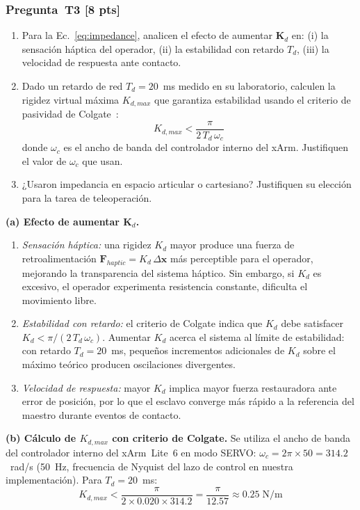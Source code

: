 \documentclass[journal,10pt,twoside]{IEEEtran}
\newcommand{\pts}[1]{\textcolor{tec_red}{\textbf{[#1 pts]}}}
\begin{document}
\subsubsection*{Pregunta~T3 \pts{8}}
\begin{enumerate}[label=(\alph*)]
  \item Para la Ec.~\eqref{eq:impedance}, analicen el efecto de
        aumentar $\bm{K}_d$ en: (i) la sensación háptica del operador,
        (ii) la estabilidad con retardo $T_d$, (iii) la velocidad
        de respuesta ante contacto.
  \item Dado un retardo de red $T_d = 20$~ms medido en su laboratorio,
        calculen la rigidez virtual máxima $K_{d,max}$ que garantiza
        estabilidad usando el criterio de pasividad de Colgate~\cite{colgate1993}:
        \[
          K_{d,max} < \frac{\pi}{2\,T_d\,\omega_c}
        \]
        donde $\omega_c$ es el ancho de banda del controlador interno
        del xArm. Justifiquen el valor de $\omega_c$ que usan.
  \item ¿Usaron impedancia en espacio articular o cartesiano?
        Justifiquen su elección para la tarea de teleoperación.
\end{enumerate}

\textbf{(a) Efecto de aumentar $\bm{K}_d$.}
\begin{enumerate}[label=\roman*.]
  \item \textit{Sensación háptica:} una rigidez $K_d$ mayor produce una
        fuerza de retroalimentación $\bm{F}_{haptic} = K_d\,\Delta\bm{x}$
        más perceptible para el operador, mejorando la transparencia del
        sistema háptico. Sin embargo, si $K_d$ es excesivo, el operador
        experimenta resistencia constante, dificulta el movimiento libre.
  \item \textit{Estabilidad con retardo:} el criterio de Colgate indica
        que $K_d$ debe satisfacer $K_d < \pi/(2\,T_d\,\omega_c)$.
        Aumentar $K_d$ acerca el sistema al límite de estabilidad:
        con retardo $T_d = 20$~ms, pequeños incrementos adicionales
        de $K_d$ sobre el máximo teórico producen oscilaciones
        divergentes.
  \item \textit{Velocidad de respuesta:} mayor $K_d$ implica mayor
        fuerza restauradora ante error de posición, por lo que el
        esclavo converge más rápido a la referencia del maestro durante
        eventos de contacto.
\end{enumerate}

\textbf{(b) Cálculo de $K_{d,max}$ con criterio de Colgate.}
Se utiliza el ancho de banda del controlador interno del xArm~Lite~6
en modo SERVO: $\omega_c = 2\pi \times 50 = 314.2$~rad/s (50~Hz,
frecuencia de Nyquist del lazo de control en nuestra implementación).
Para $T_d = 20$~ms:
\begin{equation}
  K_{d,max} < \frac{\pi}{2 \times 0.020 \times 314.2}
            = \frac{\pi}{12.57} \approx 0.25 \; \text{N/m}
  \label{eq:kdmax_20ms}
\end{equation}
\end{document}
